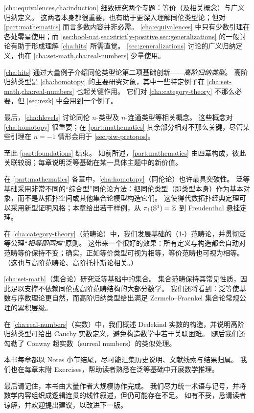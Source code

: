 \cref{cha:equivalences,cha:induction} 细致研究两个专题：等价（及相关概念）与广义归纳定义。
这两者本身都很重要，也有助于更深入理解同伦类型论；但对 \cref{part:mathematics} 而言多数内容并非必需。
\cref{cha:equivalences} 中只有少数引理在各处零星使用；而 \cref{sec:bool-nat,sec:strictly-positive,sec:generalizations} 的一般讨论有助于形成理解 \cref{cha:hits} 所需直觉。
\cref{sec:generalizations} 讨论的广义归纳定义，也在 \cref{cha:set-math,cha:real-numbers} 少量使用。

\cref{cha:hits} 通过大量例子介绍同伦类型论第二项基础创新——\emph{高阶归纳类型}。
高阶归纳类型是 \cref{cha:homotopy} 的主要研究对象，其中一些特定例子在 \cref{cha:set-math,cha:real-numbers} 也起关键作用。
它们对 \cref{cha:category-theory} 不那么必要，但 \cref{sec:rezk} 中会用到一个例子。

最后，\cref{cha:hlevels} 讨论同伦 $n$-类型及 $n$-连通类型等相关概念。
这些概念对 \cref{cha:homotopy} 很重要；在 \cref{part:mathematics} 其余部分相对不那么关键，尽管某些引理在 $n=-1$ 情形会用于 \cref{sec:piw-pretopos}。

至此 \cref{part:foundations} 结束。
如前所述，\cref{part:mathematics} 由四章构成，彼此关联较弱；每章说明泛等基础在某一具体主题中的新价值。

在 \cref{part:mathematics} 各章中，\cref{cha:homotopy}（同伦论）也许最具突破性。
泛等基础采用非常不同的“综合型”同伦论方法：把同伦类型（即类型本身）作为基本对象，而不是从拓扑空间或其他集合论模型构造它们。
这使得代数拓扑经典定理可以采用新型证明风格；本章给出若干样例，从 $\pi_1(\mathbb{S}^1)=\mathbb{Z}$ 到 Freudenthal 悬挂定理。

在 \cref{cha:category-theory}（范畴论）中，我们发展基础的（1-）范畴论，并贯彻泛等公理“\emph{相等即同构}”原则。
这带来一个很好的效果：所有定义与构造都会自动对范畴等价保持不变；确实，正如等价类型可视为相等，等价范畴也可视为相等。
（这也与高阶范畴论、高阶托扑斯论相关。）

\cref{cha:set-math}（集合论）研究泛等基础中的集合。
集合范畴保持其常见性质，因此足以支撑不依赖同伦或高阶范畴结构的大部分数学。
我们还将看到：泛等使基数与序数理论更自然，而高阶归纳类型给出满足 Zermelo--Fraenkel 集合论常规公理的累积层级。

在 \cref{cha:real-numbers}（实数）中，我们概述 Dedekind 实数的构造，并说明高阶归纳类型可给出 Cauchy 实数定义，避免构造数学中若干关联困难。
随后我们还勾勒了 Conway 超实数（surreal numbers）的类似处理。

本书每章都以 Notes 小节结尾，尽可能汇集历史说明、文献线索与结果归属。
我们也在每章末附 Exercises，帮助读者熟悉在泛等基础中开展数学推理。

最后请记住，本书由大量作者大规模协作完成。
我们尽力统一术语与记号，并将数学内容组织成逻辑连贯的线性叙述，但仍可能存在不足。
如有不妥，恳请读者谅解，并欢迎提出建议，以改进下一版。


